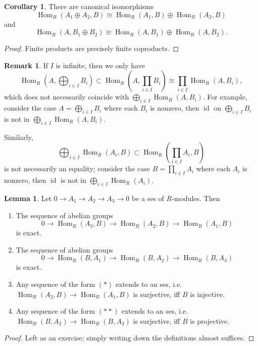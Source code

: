 \documentclass{article}
\newcommand{\id}{\operatorname{id}}
\newcommand{\Hom}{\operatorname{Hom}}
\theoremstyle{definition}
\newtheorem{lemma}[defn]{Lemma}
\newtheorem{coro}[defn]{Corollary}
\newtheorem{remark}[defn]{Remark}
\begin{document}
\begin{coro}
There are canonical isomorphisms
\[
\Hom_R(A_1\oplus A_2,B)\cong\Hom_R(A_1,B)\oplus\Hom_R(A_2,B)
\]
and
\[
\Hom_R(A,B_1\oplus B_2)\cong\Hom_R(A,B_1)\oplus\Hom_R(A,B_2).
\]
\end{coro}
\begin{proof}
Finite products are precisely finite coproducts.
\end{proof}

\begin{remark}
If $I$ is infinite, then we only have
\[
\Hom_R\left(A,\bigoplus_{i\in I}B_i\right)\subset\Hom_R\left(A,\prod_{i\in I}B_i\right)\cong\prod_{i\in I}\Hom_R(A,B_i),
\]
which does not necessarily coincide with $\bigoplus_{i\in I}\Hom_R(A,B_i)$. For example, consider the case $A=\bigoplus_{i\in I}B_i$ where each $B_i$ is nonzero, then $\id$ on $\bigoplus_{i\in I}B_i$ is not in $\bigoplus_{i\in I}\Hom_R(A,B_i)$.

Similarly,
\[
\bigoplus_{i\in I}\Hom_R(A_i,B)\subset\Hom_R\left(\prod_{i\in I}A_i,B\right)
\]
is not necessarily an equality; consider the case $B=\prod_{i\in I}A_i$ where each $A_i$ is nonzero, then $\id$ is not in $\bigoplus_{i\in I}\Hom_R(A_i)$.
\end{remark}

\begin{lemma}
\label{lemma:charofprojinjbyHom}
Let $0\rightarrow A_1\rightarrow A_2\rightarrow A_3\rightarrow 0$ be a ses of $R$-modules. Then
\begin{enumerate}
\item The sequence of abelian groups
\[
\tag{\ast}
0\rightarrow\Hom_R(A_3,B)\rightarrow\Hom_R(A_2,B)\rightarrow\Hom_R(A_1,B)
\]
is exact.
\item The sequence of abelian groups
\[
\tag{\ast\ast}
0\rightarrow\Hom_R(B,A_1)\rightarrow\Hom_R(B,A_2)\rightarrow\Hom_R(B,A_3)
\]
is exact.
\item Any sequence of the form $(\ast)$ extends to an ses, i.e. $\Hom_R(A_2,B)\rightarrow\Hom_R(A_1,B)$ is surjective, iff $B$ is injective.
\item Any sequence of the form $(\ast\ast)$ extends to an ses, i.e. $\Hom_R(B,A_2)\rightarrow\Hom_R(B,A_3)$ is surjective, iff $B$ is projective.
\end{enumerate}
\end{lemma}
\begin{proof}
Left as an exercise; simply writing down the definitions almost suffices.
\end{proof}
\end{document}
